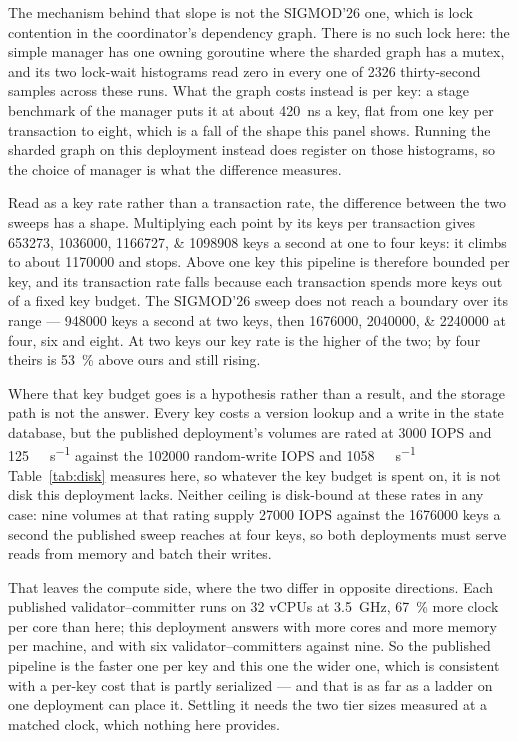 \documentclass[10pt,twocolumn]{article}
\begin{document}
The mechanism behind that slope is not the SIGMOD'26 one, which is lock contention in the
coordinator's dependency graph. There is no such lock here: the simple manager has one owning goroutine
where the sharded graph has a mutex, and its two lock-wait histograms read zero in every one of
\num{2326} thirty-second samples across these runs. What the graph costs instead is per key: a stage benchmark of the
manager puts it at about \SI{420}{\nano\second} a key, flat from one key per transaction to eight, which
is a fall of the shape this panel shows. Running the sharded graph on this deployment instead does register on
those histograms, so the choice of manager is what the difference measures.

Read as a key rate rather than a transaction rate, the difference between the two sweeps has a shape.
Multiplying each point by its keys per transaction gives \numlist{653273;1036000;1166727;1098908} keys
a second at one to four keys: it climbs to about \num{1170000} and stops. Above one key this pipeline
is therefore bounded per key, and its transaction rate falls because each transaction spends more keys
out of a fixed key budget. The SIGMOD'26 sweep does not reach a boundary over its range ---
\num{948000} keys a second at two keys, then \numlist{1676000;2040000;2240000} at four, six and eight.
At two keys our key rate is the higher of the two; by four theirs is \SI{53}{\percent} above ours and
still rising.

Where that key budget goes is a hypothesis rather than a result, and the storage path is not the
answer. Every key costs a version lookup and a write in the state database, but the published
deployment's volumes are rated at \num{3000} IOPS and \SI{125}{\mebi\byte\per\second} against the
\num{102000} random-write IOPS and \SI{1058}{\mebi\byte\per\second} Table~\ref{tab:disk} measures
here, so whatever the key budget is spent on, it is not disk this deployment lacks. Neither ceiling is
disk-bound at these rates in any case: nine volumes at that rating supply \num{27000} IOPS against the
\num{1676000} keys a second the published sweep reaches at four keys, so both deployments must serve
reads from memory and batch their writes.

That leaves the compute side, where the two differ in opposite directions. Each published
validator--committer runs on 32 vCPUs at \SI{3.5}{\giga\hertz}, \SI{67}{\percent} more clock per core
than here; this deployment answers with more cores and more memory per machine, and with six
validator--committers against nine. So the published pipeline is the faster one per key and this one the
wider one, which is consistent with a per-key cost that is partly serialized --- and that is as far as a
ladder on one deployment can place it. Settling it needs the two tier sizes measured at a matched clock,
which nothing here provides.
\end{document}
